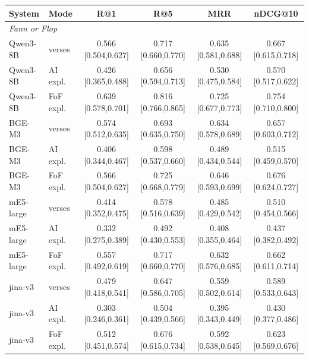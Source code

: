 \begin{tabular}{ll cccc}
\toprule
System & Mode & R@1 & R@5 & MRR & nDCG@10 \\
\midrule
\multicolumn{6}{l}{\textit{Fann or Flop}} \\
Qwen3-8B & verses & 0.566 \scriptsize [0.504,0.627] & 0.717 \scriptsize [0.660,0.770] & 0.635 \scriptsize [0.581,0.688] & 0.667 \scriptsize [0.615,0.718] \\
Qwen3-8B & AI expl. & 0.426 \scriptsize [0.365,0.488] & 0.656 \scriptsize [0.594,0.713] & 0.530 \scriptsize [0.475,0.584] & 0.570 \scriptsize [0.517,0.622] \\
Qwen3-8B & FoF expl. & 0.639 \scriptsize [0.578,0.701] & 0.816 \scriptsize [0.766,0.865] & 0.725 \scriptsize [0.677,0.773] & 0.754 \scriptsize [0.710,0.800] \\
BGE-M3 & verses & 0.574 \scriptsize [0.512,0.635] & 0.693 \scriptsize [0.635,0.750] & 0.634 \scriptsize [0.578,0.689] & 0.657 \scriptsize [0.603,0.712] \\
BGE-M3 & AI expl. & 0.406 \scriptsize [0.344,0.467] & 0.598 \scriptsize [0.537,0.660] & 0.489 \scriptsize [0.434,0.544] & 0.515 \scriptsize [0.459,0.570] \\
BGE-M3 & FoF expl. & 0.566 \scriptsize [0.504,0.627] & 0.725 \scriptsize [0.668,0.779] & 0.646 \scriptsize [0.593,0.699] & 0.676 \scriptsize [0.624,0.727] \\
mE5-large & verses & 0.414 \scriptsize [0.352,0.475] & 0.578 \scriptsize [0.516,0.639] & 0.485 \scriptsize [0.429,0.542] & 0.510 \scriptsize [0.454,0.566] \\
mE5-large & AI expl. & 0.332 \scriptsize [0.275,0.389] & 0.492 \scriptsize [0.430,0.553] & 0.408 \scriptsize [0.355,0.464] & 0.437 \scriptsize [0.382,0.492] \\
mE5-large & FoF expl. & 0.557 \scriptsize [0.492,0.619] & 0.717 \scriptsize [0.660,0.770] & 0.632 \scriptsize [0.576,0.685] & 0.662 \scriptsize [0.611,0.714] \\
jina-v3 & verses & 0.479 \scriptsize [0.418,0.541] & 0.647 \scriptsize [0.586,0.705] & 0.559 \scriptsize [0.502,0.614] & 0.589 \scriptsize [0.533,0.643] \\
jina-v3 & AI expl. & 0.303 \scriptsize [0.246,0.361] & 0.504 \scriptsize [0.439,0.566] & 0.395 \scriptsize [0.343,0.449] & 0.430 \scriptsize [0.377,0.486] \\
jina-v3 & FoF expl. & 0.512 \scriptsize [0.451,0.574] & 0.676 \scriptsize [0.615,0.734] & 0.592 \scriptsize [0.538,0.645] & 0.623 \scriptsize [0.569,0.676] \\

\end{tabular}
